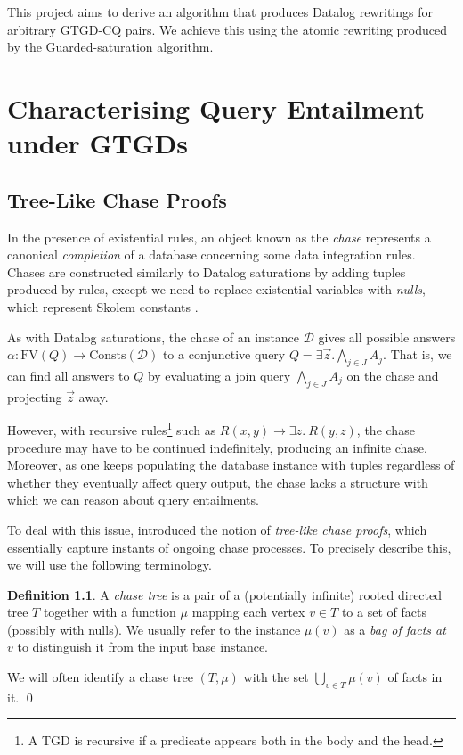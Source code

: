 \documentclass[12pt]{report}
\theoremstyle{plain}
\theoremstyle{definition}
\newtheorem{definition}[theorem]{Definition}
\def\FV{{\mathrm{FV}}}
\def\Consts{{\mathrm{Consts}}}
\begin{document}
This project aims to derive an algorithm that produces Datalog rewritings for arbitrary GTGD-CQ pairs. We achieve this using the atomic rewriting produced by the Guarded-saturation algorithm.

\newpage
\chapter{Characterising Query Entailment under GTGDs}
\label{characterising-query-entailment-under-gtgds}

\section{Tree-Like Chase Proofs}

In the presence of existential rules, an object known as the \emph{chase} represents a canonical \emph{completion} of a database concerning some data integration rules. Chases are constructed similarly to Datalog saturations by adding tuples produced by rules, except we need to replace existential variables with \emph{nulls}, which represent Skolem constants \cite{fagin_kolaitis_miller_popa_2005}.

As with Datalog saturations, the chase of an instance $\mathcal{D}$ gives all possible answers $\alpha: \FV(Q) \rightarrow \Consts(\mathcal{D})$ to a conjunctive query $Q = \exists \vec{z}. \bigwedge_{j \in J} A_j$. That is, we can find all answers to $Q$ by evaluating a join query $\bigwedge_{j \in J} A_j$ on the chase and projecting $\vec{z}$ away.

However, with recursive rules\footnote{A TGD is recursive if a predicate appears both in the body and the head.} such as $R(x, y) \rightarrow \exists z.\ R(y, z)$, the chase procedure may have to be continued indefinitely, producing an infinite chase. Moreover, as one keeps populating the database instance with tuples regardless of whether they eventually affect query output, the chase lacks a structure with which we can reason about query entailments.

To deal with this issue, \cite{benedikt_buron_germano_kappelmann_motik_2022} introduced the notion of \emph{tree-like chase proofs}, which essentially capture instants of ongoing chase processes. To precisely describe this, we will use the following terminology.

\begin{definition}
  A \emph{chase tree} is a pair of a (potentially infinite) rooted directed tree $T$ together with a function $\mu$ mapping each vertex $v \in T$ to a set of facts (possibly with nulls). We usually refer to the instance $\mu(v)$ as a \emph{bag of facts at $v$} to distinguish it from the input base instance.
  
  We will often identify a chase tree $(T, \mu)$ with the set $\bigcup_{v \in T} \mu(v)$ of facts in it.
  \qed
\end{definition}
\end{document}

